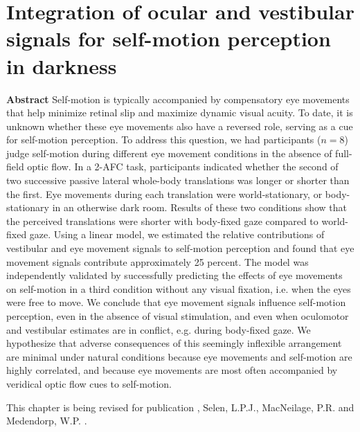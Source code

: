 
\thispagestyle{empty}

\chapter{Integration of ocular and vestibular signals for self-motion perception in darkness}
\chaptermark{}

\label{p3}

\newpage

\small {\bf Abstract} Self-motion is typically accompanied by compensatory eye movements that help minimize retinal slip and maximize dynamic visual acuity. To date, it is unknown whether these eye movements also have a reversed role, serving as a cue for self-motion perception. To address this question, we had participants ($n=8$) judge self-motion during different eye movement conditions in the absence of full-field optic flow.  In a 2-AFC task, participants indicated whether the second of two successive passive lateral whole-body translations was longer or shorter than the first. Eye movements during each translation were world-stationary, or body-stationary in an otherwise dark room. Results of these two conditions show that the perceived translations were shorter with body-fixed gaze compared to world-fixed gaze. Using a linear model, we estimated the relative contributions of vestibular and eye movement signals to self-motion perception and found that eye movement signals contribute approximately 25 percent. The model was independently validated by successfully predicting the effects of eye movements on self-motion in a third condition without any visual fixation, i.e. when the eyes were free to move. We conclude that eye movement signals influence self-motion perception, even in the absence of visual stimulation, and even when oculomotor and vestibular estimates are in conflict, e.g. during body-fixed gaze. We hypothesize that adverse consequences of this seemingly inflexible arrangement are minimal under natural conditions because eye movements and self-motion are highly correlated, and because eye movements are most often accompanied by veridical optic flow cues to self-motion.

\vfill

\noindent\underline{ \hspace{4cm} }

\noindent This chapter is being revised for publication \newline
{}, Selen, L.P.J., MacNeilage, P.R. and Medendorp, W.P. \citeyear{clemens2015a}. %

